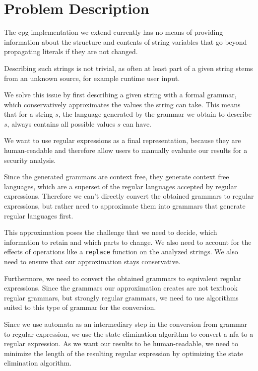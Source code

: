 \chapter{Problem Description}
\label{chapter:ProblemDescription}

The \ac{cpg} implementation we extend currently has no means of providing information about the structure and contents of string variables that go beyond propagating literals if they are not changed.

Describing such strings is not trivial, as often at least part of a given string stems from an unknown source, for example runtime user input.

We solve this issue by first describing a given string with a formal grammar, which conservatively approximates the values the string can take.
This means that for a string $s$, the language generated by the grammar we obtain to describe $s$, always contains all possible values $s$ can have.

We want to use regular expressions as a final representation, because they are human-readable and therefore allow users to manually evaluate our results for a security analysis.

Since the generated grammars are context free, they generate context free languages, which are a superset of the regular languages accepted by regular expressions. Therefore we can't directly convert the obtained grammars to regular expressions, but rather need to approximate them into grammars that generate regular languages first.

This approximation poses the challenge that we need to decide, which information to retain and which parts to change. We also need to account for the effects of operations like a \lstinline|replace| function on the analyzed strings. We also need to ensure that our approximation stays conservative.

Furthermore, we need to convert the obtained grammars to equivalent regular expressions. Since the grammars our approximation creates are not textbook regular grammars, but strongly regular grammars, we need to use algorithms suited to this type of grammar for the conversion.

Since we use automata as an intermediary step in the conversion from grammar to regular expression, we use the state elimination algorithm \cite{brzozowksi_mccluskey} to convert a \ac{nfa} to a regular expression. As we want our results to be human-readable, we need to minimize the length of the resulting regular expression by optimizing the state elimination algorithm.

